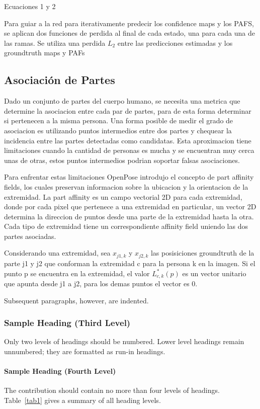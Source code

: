 \documentclass[runningheads]{llncs}
\begin{document}
Ecuaciones 1 y 2 

Para guiar a la red para iterativamente predecir los confidence maps y los PAFS, se aplican dos funciones de perdida al final de cada estado, una para cada una de las ramas. Se utiliza una perdida $L_{2}$ entre las predicciones estimadas y los groundtruth maps y PAFs 

\subsection{Asociación de Partes}
Dado un conjunto de partes del cuerpo humano, se necesita una metrica que determine la asociacion entre cada par de partes, para de esta forma determinar si pertenecen a la misma persona. Una forma posible de medir el grado de asociacion es utilizando puntos intermedios entre dos partes y chequear la incidencia entre las partes detectadas como candidatas. Esta aproximacion tiene limitaciones cuando la cantidad de personas es mucha y se encuentran muy cerca unas de otras, estos puntos intermedios podrian soportar falsas asociaciones.

Para enfrentar estas limitaciones OpenPose introdujo el concepto de part affinity fields, los cuales preservan informacion sobre la ubicacion y la orientacion de la extremidad. La part affinity es un campo vectorial 2D para cada extremidad, donde por cada pixel que pertenece a una extremidad en particular, un vector 2D determina la direccion de puntos desde una parte de la extremidad hasta la otra. Cada tipo de extremidad tiene un correspondiente affinity field uniendo las dos partes asociadas.

Considerando una extremidad, sea $x_{j1,k}$ y $x_{j2,k}$ las posisiciones groundtruth de la parte j1 y j2 que conforman la extremidad c para la persona k en la imagen. Si el punto p se encuentra en la extremidad, el valor $L^{*}_{c,k}(p)$ es un vector unitario que apunta desde j1 a j2, para los demas puntos el vector es 0.



Subsequent paragraphs, however, are indented.

\subsubsection{Sample Heading (Third Level)} Only two levels of
headings should be numbered. Lower level headings remain unnumbered;
they are formatted as run-in headings.

\paragraph{Sample Heading (Fourth Level)}
The contribution should contain no more than four levels of
headings. Table~\ref{tab1} gives a summary of all heading levels.
\end{document}
